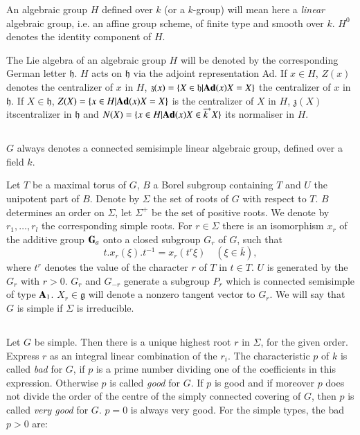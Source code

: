 An algebraic group $H$ defined over $k$ (or a $k$-group) will mean here a {\em linear} algebraic group, i.e. an affine group scheme, of finite type and smooth over $k$. $H^{0}$ denotes the identity component of $H$.

The Lie algebra of an algebraic group $H$ will be denoted by the corresponding German letter $\mathfrak{h}$. $H$ acts on $\mathfrak{h}$ via the adjoint representation Ad. If $x\in H$, $Z(x)$ denotes the centralizer of $x$ in $H$, $\mathfrak{z}(x)=\{X\in \mathfrak{h}|\mathbf{Ad} (x)X=X\}$ the centralizer of $x$ in $\mathfrak{h}$. If $X\in \mathfrak{h}$, $Z(X)=\{x\in H|\mathbf{Ad} (x)X=X\}$ is the centralizer of $X$ in $H$, $\mathfrak{z}(X)$ its\pageoriginale centralizer in $\mathfrak{h}$ and $N(X)=\{x\in H|\mathbf{Ad} (x)X\in \overline{k}^{*}X\}$ its normaliser in $H$.

\subsection{}\label{art19-sec0.2}
$G$ always denotes a connected semisimple linear algebraic group, defined over a field $k$.

Let $T$ be a maximal torus of $G$, $B$ a Borel subgroup containing $T$ and $U$ the unipotent part of $B$. Denote by $\Sigma$ the set of roots of $G$ with respect to $T$. $B$ determines an order on $\Sigma$, let $\Sigma^{+}$ be the set of positive roots. We denote by $r_{1},\ldots,r_{l}$ the corresponding simple roots. For $r\in \Sigma$ there is an isomorphism $x_{r}$ of the additive group $\mathbf{G}_{a}$ onto a closed subgroup $G_{r}$ of $G$, such that
$$
t.x_{r}(\xi).t^{-1}=x_{r}(t^{r}\xi)\quad (\xi\in \overline{k}),
$$
where $t^{r}$ denotes the value of the character $r$ of $T$ in $t\in T$. $U$ is generated by the $G_{r}$ with $r>0$. $G_{r}$ and $G_{-r}$ generate a subgroup $P_{r}$ which is connected semisimple of type $\mathbf{A}_{1}$. $X_{r}\in \mathfrak{g}$ will denote a nonzero tangent vector to $G_{r}$. We will say that $G$ is simple if $\Sigma$ is irreducible.

\subsection{}\label{art19-sec0.3}
Let $G$ be simple. Then there is a unique highest root $r$ in $\Sigma$, for the given order. Express $r$ as an integral linear combination of the $r_{i}$. The characteristic $p$ of $k$ is called {\em bad} for $G$, if $p$ is a prime number dividing one of the coefficients in this expression. Otherwise $p$ is called {\em good} for $G$. If $p$ is good and if moreover $p$ does not divide the order of the centre of the simply connected covering of $G$, then $p$ is called {\em very good} for $G$. $p=0$ is always very good. For the simple types, the bad $p>0$ are:

